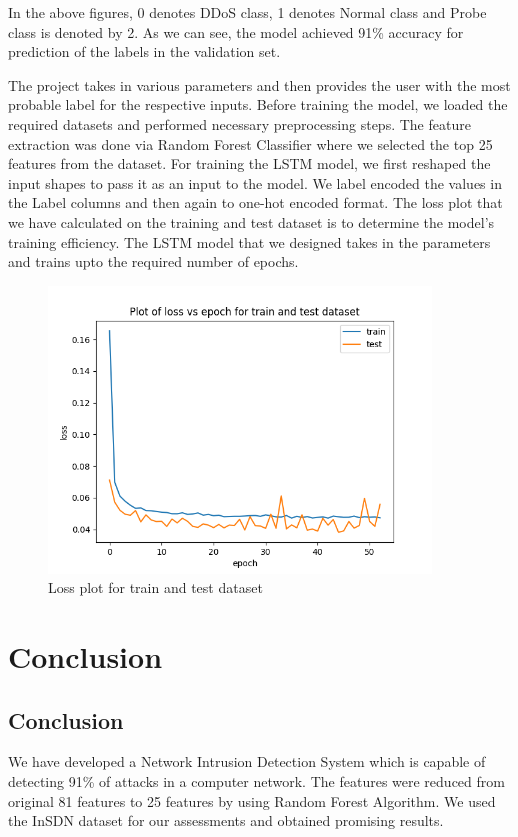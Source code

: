 In the above figures, 0 denotes DDoS class, 1 denotes Normal class and Probe class is denoted by 2. As we can see, the model achieved 91\% accuracy for prediction of the labels in the validation set.
\par 
The project takes in various parameters and then provides the user with the most probable label for the respective inputs. Before training the model, we loaded the required datasets and performed necessary preprocessing steps. The feature extraction was done via Random Forest Classifier where we selected the top 25 features from the dataset. For training the LSTM model, we first reshaped the input shapes to pass it as an input to the model. We label encoded the values in the Label columns and then again to one-hot encoded format. The loss plot that we have calculated on the training and test dataset is to determine the model's training efficiency. The LSTM model that we designed takes in the parameters and trains upto the required number of epochs. 
\begin{figure}[tbhh]
	\begin{center}
		\includegraphics[width=4in]{images/lstm_multi_loss.png} 
		\caption{Loss plot for train and test dataset} %
		\label{Loss plot for train and test dataset} %
	\end{center}
\end{figure}
\chapter{Conclusion}
\vspace{-18pt}
\section{Conclusion}
\vspace{-18pt}
We have developed a Network Intrusion Detection System which is capable of detecting 91\% of attacks in a computer network. The features were reduced from original 81 features to 25 features  by using Random Forest Algorithm. We used the InSDN dataset for our assessments and obtained promising results.
